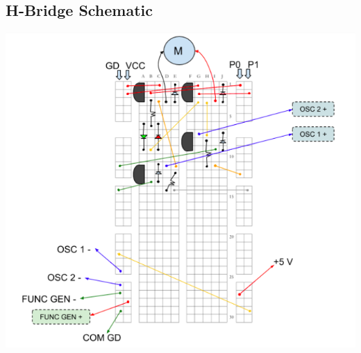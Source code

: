 \documentclass[11.5pt]{article}
\begin{document}
\newpage



\subsection{H-Bridge Schematic}

\begin{center}
\includegraphics[scale=.7]{Images/hbridge.png}
\end{center}
\end{document}
